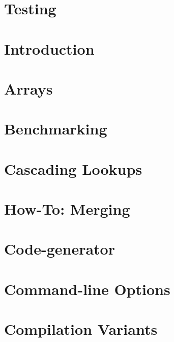 \let\mypdfximage\pdfximage\def\pdfximage{\immediate\mypdfximage}\documentclass[twoside]{book}
\newcommand{\+}{\discretionary{\mbox{\scriptsize$\hookleftarrow$}}{}{}}
\begin{document}
\chapter{Testing}
\label{doc_TESTING_md}

\chapter{Introduction}
\label{doc_tutorials_application-integration_md}

\chapter{Arrays}
\label{doc_tutorials_arrays_md}

\chapter{Benchmarking}
\label{doc_tutorials_benchmarking_md}

\chapter{Cascading Lookups}
\label{doc_tutorials_cascading_md}

\chapter{How-\/\+To\+: Merging}
\label{doc_tutorials_cmerge_md}

\chapter{Code-\/generator}
\label{doc_tutorials_code-generator_md}

\chapter{Command-\/line Options}
\label{doc_tutorials_command-line-options_md}

\chapter{Compilation Variants}
\label{doc_tutorials_compilation-variants_md}

\end{document}
